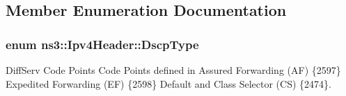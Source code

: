\subsection{Member Enumeration Documentation}
\subsubsection[{\texorpdfstring{Dscp\+Type}{DscpType}}]{\setlength{\rightskip}{0pt plus 5cm}enum {\bf ns3\+::\+Ipv4\+Header\+::\+Dscp\+Type}}\hypertarget{classns3_1_1Ipv4Header_aaa17802e7732a689311b72d48d1a3450}{}\label{classns3_1_1Ipv4Header_aaa17802e7732a689311b72d48d1a3450}


Diff\+Serv Code Points Code Points defined in Assured Forwarding (AF) \{2597\} Expedited Forwarding (EF) \{2598\} Default and Class Selector (CS) \{2474\}. 

